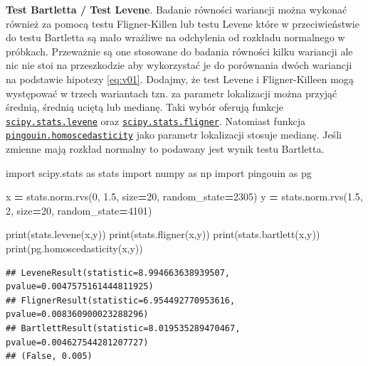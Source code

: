 \documentclass[polish,]{book}
\newenvironment{Shaded}{\begin{snugshade}}{\end{snugshade}}
\newcommand{\BuiltInTok}[1]{#1}
\newcommand{\DecValTok}[1]{\textcolor[rgb]{0.00,0.00,0.81}{#1}}
\newcommand{\FloatTok}[1]{\textcolor[rgb]{0.00,0.00,0.81}{#1}}
\newcommand{\ImportTok}[1]{#1}
\newcommand{\NormalTok}[1]{#1}
\newcommand{\OperatorTok}[1]{\textcolor[rgb]{0.81,0.36,0.00}{\textbf{#1}}}
\begin{document}
\textbf{Test Bartletta / Test Levene}. Badanie równości wariancji można wykonać również za pomocą testu Fligner-Killen lub testu Levene które w przeciwieństwie do testu Bartletta są mało wrażliwe na odchylenia od rozkładu normalnego w próbkach. Przeważnie są one stosowane do badania równości kilku wariancji ale nic nie stoi na przeszkodzie aby wykorzystać je do porównania dwóch wariancji na podstawie hipotezy \eqref{eq:v01}. Dodajmy, że test Levene i Fligner-Killeen mogą występować w trzech wariantach tzn. za parametr lokalizacji można przyjąć średnią, średnią uciętą lub medianę. Taki wybór oferują funkcje \href{https://docs.scipy.org/doc/scipy/reference/generated/scipy.stats.levene.html\#scipy.stats.levene}{\texttt{scipy.stats.levene}} oraz \href{https://docs.scipy.org/doc/scipy/reference/generated/scipy.stats.fligner.html\#scipy.stats.fligner}{\texttt{scipy.stats.fligner}}. Natomiast funkcja \href{https://pingouin-stats.org/generated/pingouin.homoscedasticity.html\#pingouin.homoscedasticity}{\texttt{pingouin.homoscedasticity}} jako parametr lokalizacji stosuje medianę. Jeśli zmienne mają rozkład normalny to podawany jest wynik testu Bartletta.

\begin{Shaded}
\begin{Highlighting}[]
\ImportTok{import}\NormalTok{ scipy.stats }\ImportTok{as}\NormalTok{ stats}
\ImportTok{import}\NormalTok{ numpy }\ImportTok{as}\NormalTok{ np}
\ImportTok{import}\NormalTok{ pingouin }\ImportTok{as}\NormalTok{ pg}

\NormalTok{x }\OperatorTok{=}\NormalTok{ stats.norm.rvs(}\DecValTok{0}\NormalTok{, }\FloatTok{1.5}\NormalTok{, size}\OperatorTok{=}\DecValTok{20}\NormalTok{, random_state}\OperatorTok{=}\DecValTok{2305}\NormalTok{)}
\NormalTok{y }\OperatorTok{=}\NormalTok{ stats.norm.rvs(}\FloatTok{1.5}\NormalTok{, }\DecValTok{2}\NormalTok{, size}\OperatorTok{=}\DecValTok{20}\NormalTok{, random_state}\OperatorTok{=}\DecValTok{4101}\NormalTok{)}

\BuiltInTok{print}\NormalTok{(stats.levene(x,y))}
\BuiltInTok{print}\NormalTok{(stats.fligner(x,y))}
\BuiltInTok{print}\NormalTok{(stats.bartlett(x,y))}
\BuiltInTok{print}\NormalTok{(pg.homoscedasticity(x,y))}
\end{Highlighting}
\end{Shaded}

\begin{verbatim}
## LeveneResult(statistic=8.994663638939507, pvalue=0.0047575161444811925)
## FlignerResult(statistic=6.954492770953616, pvalue=0.008360900023288296)
## BartlettResult(statistic=8.019535289470467, pvalue=0.004627544281207727)
## (False, 0.005)
\end{verbatim}
\end{document}

